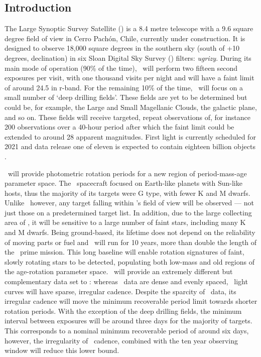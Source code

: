 \subsection{Introduction}

The Large Synoptic Survey Satellite (\LSST) is a 8.4 metre telescope with a
9.6 square degree field of view in Cerro Pach\'{o}n, Chile, currently under
construction.
It is designed to observe 18,000 square degrees in the southern sky (south of
+10 degrees, declination) in six Sloan Digital Sky Survey (\SDSS) filters:
{\it ugrizy}.
During its main mode of operation (90\% of the time), \LSST\ will perform two
fifteen second exposures per visit, with one thousand visits per night and
will have a faint limit of around 24.5 in r-band.
For the remaining 10\% of the time, \LSST\ will focus on a small number of
`deep drilling fields'.
These fields are yet to be determined but could be, for example, the Large and
Small Magellanic Clouds, the galactic plane, and so on.
These fields will receive targeted, repeat observations of, for instance 200
observations over a 40-hour period after which the faint limit could be
extended to around 28 apparent magnitudes.
First light is currently scheduled for 2021 and data release one of eleven is
expected to contain eighteen billion objects \citep{Ivezic2008}.

\LSST\ will provide photometric rotation periods for a new region of
period-mass-age parameter space.
The \kepler\ spacecraft focused on Earth-like planets with Sun-like hosts,
thus the majority of its targets were G type, with fewer K and M dwarfs.
Unlike \kepler\ however, any target falling within \LSST's field of view will
be observed --- not just those on a predetermined target list.
In addition, due to the large collecting area of \LSST, it will be sensitive
to a large number of faint stars, including many K and M dwarfs.
Being ground-based, its lifetime does not depend on the reliability of moving
parts or fuel and \LSST\ will run for 10 years, more than double the length of
the \kepler\ prime mission.
This long baseline will enable rotation signatures of faint, slowly rotating
stars to be detected, populating both low-mass and old regions of the
age-rotation parameter space.
\LSST\ will provide an extremely different but complementary data set to
\kepler: whereas \kepler\ data are dense and evenly spaced, \LSST\ light
curves will have sparse, irregular cadence.
Despite the sparcity of \LSST\ data, its irregular cadence will move the
minimum recoverable period limit towards shorter rotation periods.
With the exception of the deep drilling fields, the minimum interval
between exposures will be around three days for the majority of targets.
This corresponds to a nominal minimum recoverable period of around six days,
however, the irregularity of \LSST\ cadence, combined with the ten year
observing window will reduce this lower bound.

